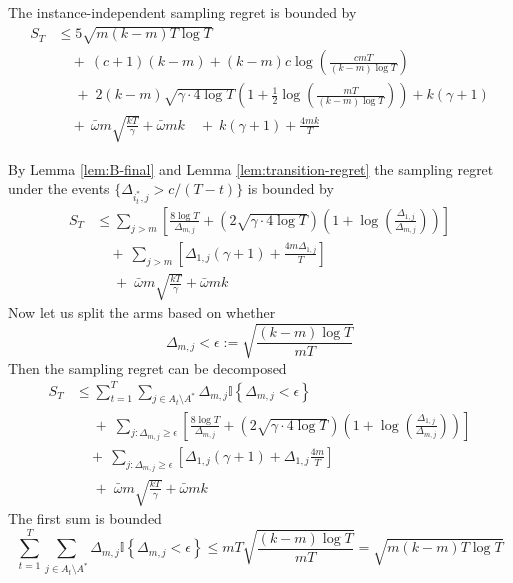 \documentclass[opre,blindrev]{informs3}
\newcommand{\ind}[1]{\mathbb{I}\left\{#1\right\}}
\begin{document}
\begin{APPENDICES}
\begin{lemma}\label{lem:instance-independent-regret}
    The instance-independent sampling regret is bounded by
    \begin{align*}
        S_T&\leq 5\sqrt{m(k-m)T\log T}\\
        &\quad +~ (c+1)(k-m) +(k-m)c\log\left(\frac{cmT}{(k-m)\log T}\right)\\
        &\quad\;+\;2(k-m)\sqrt{\gamma \cdot 4\log T}\left(1+\frac{1}{2}\log\left(\frac{mT}{(k-m)\log T}\right)\right)+k(\gamma + 1)\\
        &\quad + ~\bar{\omega} m\sqrt{\frac{kT}{\gamma}} + \bar{\omega}mk
        \quad + ~ k(\gamma + 1) + \frac{4mk}{T}
    \end{align*}
\end{lemma}
    By Lemma \ref{lem:B-final} and Lemma \ref{lem:transition-regret} the sampling regret under the events \(\{\Delta_{i^*_t,j}>c/(T-t)\}\) is bounded by
    \begin{align*}
        S_T&\leq \sum_{j>m} \left[\frac{8\log T}{\Delta_{m,j}}+ \left(2\sqrt{\gamma \cdot 4\log T}\right)\left(1+\log\left(\frac{\Delta_{1,j}}{\Delta_{m,j}}\right)\right)\right]\\
        & \quad + ~\sum_{j>m} \left[\Delta_{1,j}(\gamma + 1) + \frac{4m\Delta_{1,j}}{T}\right]\\
        & \quad\;+\; \bar{\omega} m\sqrt{\frac{kT}{\gamma}} + \bar{\omega}mk
    \end{align*}
    Now let us split the arms based on whether 
    \[\Delta_{m,j}< \epsilon:=\sqrt{\frac{(k-m)\log T}{mT}}\]
    Then the sampling regret can be decomposed
    \begin{align*}
        S_T&\leq \sum_{t=1}^T\sum_{j\in A_t\setminus A^*}\Delta_{m,j}\ind{\Delta_{m,j}<\epsilon }\\
        &\quad\;+\;\sum_{j:\Delta_{m,j}\geq\epsilon} \left[\frac{8\log T}{\Delta_{m,j}}+ \left(2\sqrt{\gamma \cdot 4\log T}\right)\left(1+\log\left(\frac{\Delta_{1,j}}{\Delta_{m,j}}\right)\right)\right]\\
        & \quad + ~\sum_{j:\Delta_{m,j}\geq\epsilon} \left[\Delta_{1,j}(\gamma + 1) + \Delta_{1,j}\frac{4m}{T}\right]\\
        & \quad\;+\; \bar{\omega} m\sqrt{\frac{kT}{\gamma}} + \bar{\omega}mk
    \end{align*}
    The first sum is bounded
    \[\sum_{t=1}^T\sum_{j\in A_t\setminus A^*}\Delta_{m,j}\ind{\Delta_{m,j}<\epsilon }\leq mT\sqrt{\frac{(k-m)\log T}{mT}}=\sqrt{m(k-m)T\log T}\]

\end{APPENDICES}
\end{document}

